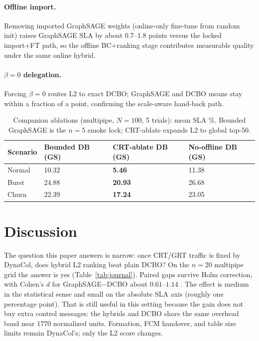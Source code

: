 \documentclass[pdflatex,sn-mathphys-num,iicol]{sn-jnl}
\begin{document}
\paragraph{Offline import.}
Removing imported GraphSAGE weights (online-only fine-tune from random init)
raises GraphSAGE SLA by about 0.7--1.8 points versus the locked import+FT path, so
the offline BC+ranking stage contributes measurable quality under the same
online hybrid.

\paragraph{$\beta{=}0$ delegation.}
Forcing $\beta{=}0$ routes L2 to exact DCBO; GraphSAGE and DCBO means stay within a
fraction of a point, confirming the scale-aware hand-back path.

\begin{table}[htbp]
\centering
\caption{Companion ablations (multipipe, $N{=}100$, 5 trials): mean SLA \%.
Bounded GraphSAGE is the $n{=}5$ smoke lock; CRT-ablate expands L2 to global top-50.}
\label{tab:ablate}
\scriptsize
\begin{tabular}{@{}llll@{}}
\toprule
Scenario & Bounded DB (GS) & CRT-ablate DB (GS) & No-offline DB (GS) \\
\midrule
Normal & 10.32 & \textbf{5.46} & 11.38 \\
Burst & 24.88 & \textbf{20.93} & 26.68 \\
Churn & 22.39 & \textbf{17.24} & 23.05 \\
\bottomrule
\end{tabular}
\end{table}

\section{Discussion}
\label{sec:disc}

The question this paper answers is narrow: once CRT/GRT traffic is fixed by
DynaCol, does hybrid L2 ranking beat plain DCBO? On the $n{=}20$ multipipe grid
the answer is yes (Table~\ref{tab:journal}). Paired gaps survive Holm correction,
with Cohen's $d$ for GraphSAGE$-$DCBO about $0.61$--$1.14$
\cite{cohen_power1988}. The effect is medium in the statistical sense and small
on the absolute SLA axis (roughly one percentage point). That is still useful
in this setting because the gain does not buy extra control messages: the
hybrids and DCBO share the same overhead band near $1770$ normalized units.
Formation, FCM handover, and table size limits remain DynaCol's; only the L2
score changes.
\end{document}

